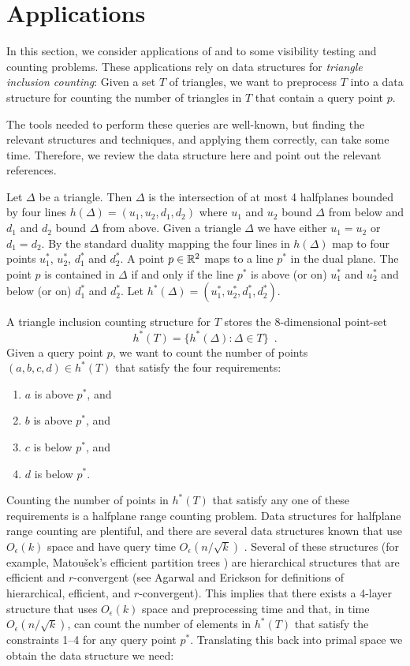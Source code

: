 \documentclass{patmorin}
\newcommand{\Oe}{O_\epsilon}
\begin{document}
\section{Applications}

In this section, we consider applications of  and
 to some visibility testing and counting problems. These
applications rely on data structures for \emph{triangle inclusion
counting}:  Given a set $T$ of triangles, we want to preprocess $T$
into a data structure for counting the number of triangles in $T$ that
contain a query point $p$.

The tools needed to perform these queries
are well-known, but finding the relevant structures and techniques,
and applying them correctly, can take some time.  Therefore, we review
the data structure here and point out the relevant references.

Let $\Delta$ be a triangle. Then $\Delta$ is the intersection of at most
4 halfplanes bounded by four lines $h(\Delta)=(u_1,u_2,d_1,d_2)$ where $u_1$
and $u_2$ bound $\Delta$ from below and $d_1$ and $d_2$ bound $\Delta$
from above. Given a  triangle $\Delta$ we have either $u_1=u_2$ or $d_1=d_2$.
By the standard duality mapping \cite[Section~8.2]{bcko08} the four lines
in $h(\Delta)$ map to four points $u_1^*$, $u_2^*$, $d_1^*$ and $d_2^*$.
A point $p\in\mathbb{R}^2$ maps to a line $p^*$ in the dual plane.  The point
$p$ is contained in $\Delta$ if and only if the line $p^*$ is above
(or on) $u_1^*$ and $u_2^*$ and below (or on) $d_1^*$ and $d_2^*$.
Let $h^*(\Delta)=(u_1^*,u_2^*,d_1^*,d_2^*)$.

A triangle inclusion counting structure for $T$ stores the 8-dimensional
point-set
\[
    h^*(T) = \{ h^*(\Delta) : \Delta\in T \} \enspace .
\]
Given a query point $p$, we want to count the number of points
$(a,b,c,d)\in h^*(T)$ that satisfy the four requirements:
\begin{enumerate}
  \item $a$ is above $p^*$, and
  \item $b$ is above $p^*$, and
  \item $c$ is below $p^*$, and
  \item $d$ is below $p^*$.
\end{enumerate}
Counting the number of points in $h^*(T)$ that satisfy any one of these
requirements is a halfplane range counting problem.  Data structures
for halfplane range counting are plentiful, and there are several
data structures known that use $\Oe(k)$ space and have query time
$\Oe(n/\sqrt{k})$ \cite[Section~4]{ae99}.  Several of these structures
(for example, Matou\v{s}ek's efficient partition trees \cite{m92}) are
hierarchical structures that are efficient and $r$-convergent (see Agarwal
and Erickson \cite[Section~5]{ae99} for definitions of hierarchical,
efficient, and $r$-convergent).  This implies \cite[Theorem~10]{ae99}
that there exists a 4-layer structure that uses $\Oe(k)$ space and
preprocessing time and that, in time $\Oe(n/\sqrt{k})$, can count the
number of elements in $h^*(T)$ that satisfy the constraints 1--4 for any
query point $p^*$.  Translating this back into primal space we obtain
the data structure we need:
\end{document}
